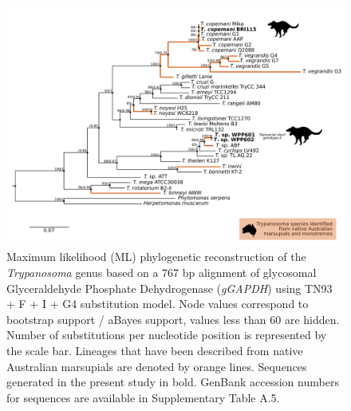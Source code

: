 \documentclass[a4paper, nobind]{templates/ociamthesis}
\begin{document}
\begin{figure}
\includegraphics[width=0.95\linewidth]{figures/ms-figs/Ch6-Fig3} \caption[Phylogenetic tree (\textit{gGAPDH}) of \textit{Trypanosoma} spp. from the Tasmanian devil.]{Maximum likelihood (ML) phylogenetic reconstruction of the \textit{Trypanosoma} genus based on a 767 bp alignment of glycosomal Glyceraldehyde Phosphate Dehydrogenase (\textit{gGAPDH}) using TN93 + F + I + G4 substitution model. Node values correspond to bootstrap support / aBayes support, values less than 60 are hidden. Number of substitutions per nucleotide position is represented by the scale bar. Lineages that have been described from native Australian marsupials are denoted by orange lines. Sequences generated in the present study in bold. GenBank accession numbers for sequences are available in Supplementary Table A.5.}\label{fig:F63}
\end{figure}
\end{document}

